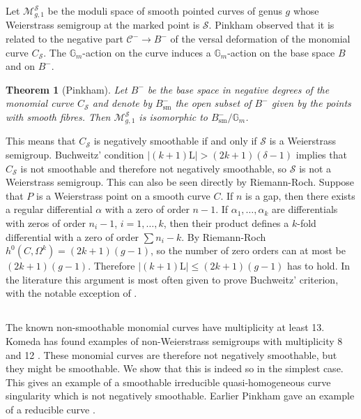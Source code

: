 \documentclass{amsart}
\renewcommand{\S}{\mathcal S}
\renewcommand{\L}{\mathrm L}
\newtheorem{thm}{Theorem}[section]
\theoremstyle{definition}
\theoremstyle{remark}
\begin{document}
Let $\mathcal M_{g,1}^{\S}$ be the moduli space of smooth  pointed curves of genus $g$
whose Weierstrass semigroup at the marked point is $\S$. 
Pinkham \cite[Section 13]{Pi} observed that it is 
related to the negative part $\mathcal C^-\to B^- $
of the versal deformation of  the monomial curve $C_\S$. The $\mathbb G_m$-action on
the curve induces a  $\mathbb G_m$-action  on the base space $B$ and on $B^-$.

\begin{thm}[Pinkham]
Let $B^-$ be the base space in negative degrees of the monomial curve $C_\S$ and 
denote by $B^-_\text{sm}$ the open subset of $B^-$ given by the points
with smooth fibres. Then  $\mathcal M_{g,1}^{\S}$ is isomorphic to 
$B^-_\text{sm}/\mathbb G_m$.
\end{thm}

This means that $C_\S$ is negatively smoothable if and only if $\S$ is a Weierstrass semigroup.
Buchweitz'  condition  $|(k+1)\L|>(2k+1)(\delta-1)$  implies that $C_\S$ is not smoothable 
and therefore not negatively smoothable, so $\S$ is not a Weierstrass semigroup.
This can also be seen directly by Riemann-Roch. Suppose that $P$ is a Weierstrass point
on a smooth curve $C$. If $n$ is a gap, then there exists a regular differential
$\alpha$ with a zero of order $n-1$.  If $\alpha_1,\dots,\alpha_k$ are differentials
with zeros of order $n_i-1$, $i=1,\dots,k$, then their product defines a
$k$-fold differential with a zero of order $\sum n_i-k$. By Riemann-Roch 
$h^0(C,\Omega^k)=(2k+1)(g-1)$, so the number of zero orders can at most  be $(2k+1)(g-1)$.
Therefore $|(k+1)\L|\leq(2k+1)(g-1)$ has to hold.
%
In the literature this argument is most often given to prove Buchweitz' criterion,
with the notable exception of \cite{KW}.


\subsection{}
The known non-smoothable monomial curves have multiplicity at least 13.
Komeda has found examples of non-Weierstrass semigroups with multiplicity 8 and 12
\cite{Ko2}. These monomial curves are therefore not  negatively smoothable, but  they
might be smoothable. We show that this is indeed so in the simplest case.
This gives an  example of a smoothable irreducible
quasi-homogeneous curve singularity which is not   negatively smoothable. Earlier Pinkham gave an example of a reducible curve \cite[p. 70]{Pi2}.
\end{document}
